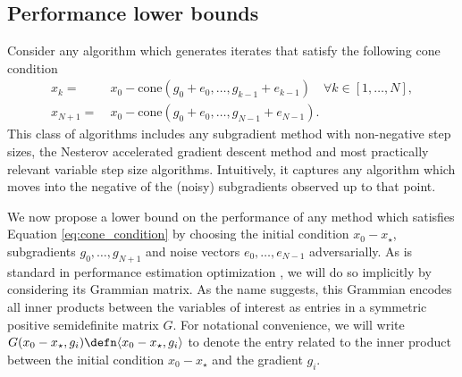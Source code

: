 \documentclass{article}
\begin{document}
\subsection{Performance lower bounds}
\label{sec:univ-lower-bound}

Consider any algorithm which generates iterates that satisfy the following cone condition
\begin{equation}
  \label{eq:cone_condition}
  \begin{split}
    x_k = &~x_0 - \text{cone}(g_0+e_0, \dots, g_{k-1}+e_{k-1
            }) \quad \forall k \in [1, \dots, N],\\
    x_{N+1}= &~ x_0 - \text{cone}(g_0+e_0, \dots, g_{N-1}+e_{N-1}).
  \end{split}
\end{equation}
This class of algorithms includes any subgradient method with non-negative step sizes, the Nesterov accelerated gradient descent method and most practically relevant variable step size algorithms. Intuitively, it captures any algorithm which moves into the negative of the (noisy) subgradients observed up to that point.

We now propose a lower bound on the performance of any method which satisfies Equation \eqref{eq:cone_condition} by choosing the initial condition $x_0-x_\star$, subgradients $g_0, \dots, g_{N+1}$ and noise vectors $e_0, \dots, e_{N-1}$ adversarially. As is standard in performance estimation optimization \citep{Drori_Teboulle_2016, taylor_smooth_2017}, we will do so implicitly by considering its Grammian matrix. As the name suggests, this Grammian encodes all inner products between the variables of interest as entries in a symmetric positive semidefinite matrix $G$. For notational convenience, we will write 
\(
  G(x_0-x_\star, g_i) \defn \langle x_0-x_\star, g_i \rangle
\)
to denote the entry related to the inner product between the initial condition $x_0-x_\star$ and the gradient $g_i$.
\end{document}
